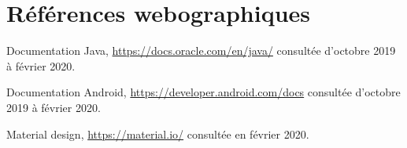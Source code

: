 \section{Références webographiques}
Documentation Java, \href{https://docs.oracle.com/en/java/}{https://docs.oracle.com/en/java/} consultée d'octobre 2019
à février 2020.

\vspace{10pt}
Documentation Android, \href{https://developer.android.com/docs}{https://developer.android.com/docs} consultée d'octobre 2019
à février 2020.

\vspace{10pt}
Material design, \href{https://material.io/}{https://material.io/} consultée en février 2020.
